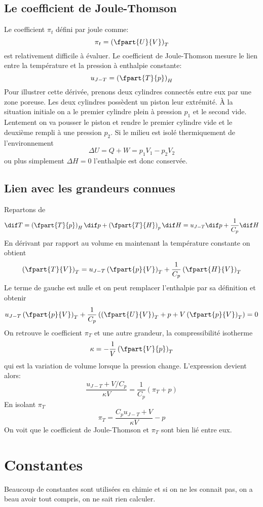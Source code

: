 \subsection{Le coefficient de Joule-Thomson}
Le coefficient $\pi_t$ défini par joule comme:
\[ \pi_t = \left(\fpart{U}{V}\right)_T \]
est relativement difficile à évaluer.
Le coefficient de Joule-Thomson mesure le lien entre la température et
la pression à enthalpie constante:
\[  u_{J-T} = \left(\fpart{T}{p}\right)_H \]
Pour illustrer cette dérivée, prenons deux cylindres connectés
entre eux par une zone poreuse.
Les deux cylindres possèdent un piston leur extrémité.
À la situation initiale on a le premier cylindre plein
à pression $p_1$ et le second vide.
Lentement on va pousser le piston et rendre le premier cylindre vide
et le deuxième rempli à une pression $p_2$.
Si le milieu est isolé thermiquement de l'environnement
\[ \Delta U = Q+ W = p_1V_1-p_2V_2 \]
ou plus simplement $\Delta H = 0$ l'enthalpie est donc conservée.

\subsection{Lien avec les grandeurs connues}
Repartons de
\[ \dif T = \left ( \fpart{T}{p}\right)_H \dif p+
\left ( \fpart{T}{H}\right)_p \dif H = u_{J-T}\dif p+\frac 1{C_p}\dif H \]
En dérivant par rapport au volume en maintenant
la température constante on obtient
\[ \left ( \fpart{T}{V} \right)_T =
  u_{J-T}\left(\fpart{p}{V}\right)_T+
  \frac 1{C_p}\left(\fpart{H}{V}\right)_T \]
Le terme de gauche est nulle et on peut remplacer
l'enthalpie par sa définition et obtenir
\[ u_{J-T}\left(\fpart{p}{V}\right)_T+
  \frac 1{C_p} \left( \left(\fpart{U}{V}\right)_T+p+
  V\left(\fpart{p}{V}\right)_T\right) = 0 \]
On retrouve le coefficient $\pi_T$ et une autre grandeur,
la compressibilité isotherme
\[  \kappa = - \frac 1V \left(\fpart{V}{p}\right)_T \]
qui est la variation de volume lorsque la pression change.
L'expression devient alors:
\[ \frac{u_{J-T}+V/C_p}{\kappa V} = \frac 1{C_p}(\pi_T+p) \]
En isolant $\pi_T$
\[  \pi_T = \frac {C_p u_{J-T}+V}{\kappa V}-p \]
On voit que le coefficient de Joule-Thomson et $\pi_T$ sont bien lié entre eux.

\section{Constantes}
Beaucoup de constantes sont utilisées en chimie et si on ne les connait pas,
on a beau avoir tout compris, on ne sait rien calculer.

